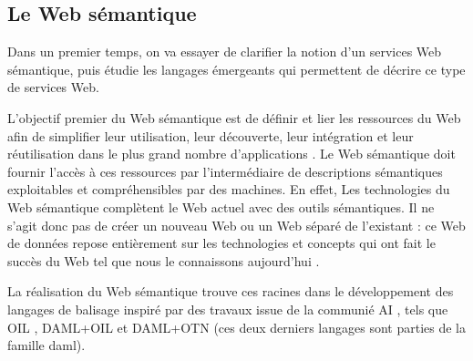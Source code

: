 \begin{appendices}
\chapter{Le Web sémantique}
\label{annexe:semantic-web}





Dans un premier temps, on va essayer de clarifier la notion d'un
services Web sémantique, puis étudie les langages émergeants qui
permettent de décrire ce type de services Web.

L'objectif premier du Web sémantique est de définir et lier les
ressources du Web afin de simplifier leur utilisation, leur
découverte, leur intégration et leur réutilisation dans le plus grand
nombre d'applications \cite{berners2001semantic}. Le Web sémantique
doit fournir l'accès à ces ressources par l'intermédiaire de
descriptions sémantiques exploitables et compréhensibles par des
machines. En effet, Les technologies du Web sémantique complètent le
Web actuel avec des outils sémantiques. Il ne s'agit donc pas de créer
un nouveau Web ou un Web séparé de l'existant : ce Web de données
repose entièrement sur les technologies et concepts qui ont fait le
succès du Web tel que nous le connaissons aujourd'hui
\cite{bertails2010web}.

La réalisation du Web sémantique trouve ces racines dans le
développement des langages de balisage inspiré par des travaux issue
de la communié AI \cite{mcilraith2001semantic}, tels que \textsc{OIL}
\cite{fensel2001oil}, \textsc{DAML+OIL} \cite{horrocks2002daml+oil} et
\textsc{DAML+OTN} \cite{mcguinness2003daml} (ces deux derniers
langages sont parties de la famille \acrshort{daml}).


\end{appendices}
